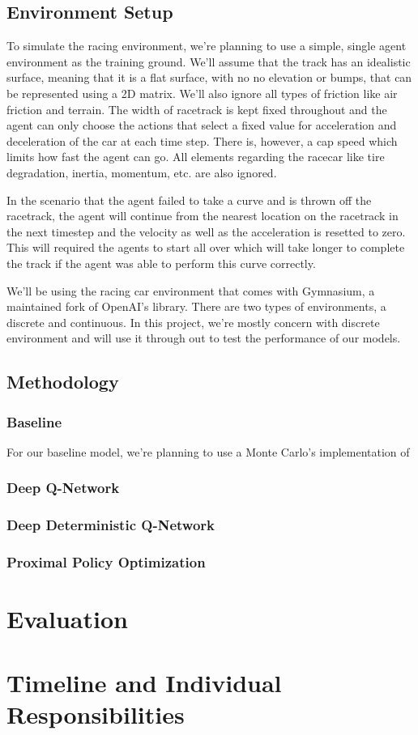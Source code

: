 \documentclass{article}
\begin{document}
\subsection{Environment Setup}
To simulate the racing environment, we're planning to use a simple, single agent
environment as the training ground. We'll assume that the track has an
idealistic surface, meaning that it is a flat surface, with no no elevation or
bumps, that can be represented
using a 2D matrix. We'll also ignore all types of friction like air friction and terrain. 
The width of racetrack is kept fixed throughout and the agent can only choose
the actions that select a fixed value for acceleration and deceleration of the
car at each time step. There is, however, a cap speed which limits how fast the
agent can go. All elements regarding the racecar like tire degradation, inertia, momentum,
etc. are also ignored. 

In the scenario that the agent failed to take a curve and is thrown off the
racetrack, the agent will continue from the nearest location on the racetrack in
the next timestep and the velocity as well as the acceleration is resetted to
zero. This will required the agents to start all over which will take longer to
complete the track if the agent was able to perform this curve correctly.

We'll be using the racing car environment that comes with Gymnasium, a
maintained fork of OpenAI's library. There are two types of environments, a
discrete and continuous. In this project, we're mostly concern with discrete
environment and will use it through out to test the performance of our models.
\subsection{Methodology}
\subsubsection{Baseline}
For our baseline model, we're planning to use a Monte Carlo's implementation of 
\subsubsection{Deep Q-Network}
\subsubsection{Deep Deterministic Q-Network}
\subsubsection{Proximal Policy Optimization}
\section{Evaluation}
\section{Timeline and Individual Responsibilities}



\end{document}
